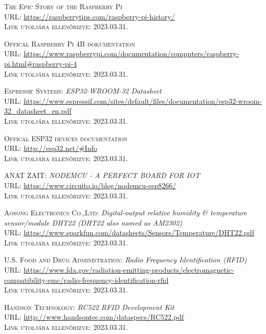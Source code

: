 \documentclass[
]{thesis-ekf}
\theoremstyle{definition}
\theoremstyle{remark}
\begin{document}
\begin{thebibliography}{20}
		\textsc{The Epic Story of the Raspberry Pi}\\
		\textsc{URL:} \url{https://raspberrytips.com/raspberry-pi-history/}\\
		\textsc{Link utoljára ellenőrizve:} 2023.03.31.
		
		\textsc{Offical Raspberry Pi 4B dokumentation}\\
		\textsc{URL:} \url{https://www.raspberrypi.com/documentation/computers/raspberry-pi.html#raspberry-pi-4}\\
		\textsc{Link utoljára ellenőrizve:} 2023.03.31.
		
		\textsc{Espressif Systems:} \emph{ESP32­-WROOM-­32 Datasheet}\\
		\textsc{URL:} \url{https://www.espressif.com/sites/default/files/documentation/esp32-wroom-32_datasheet_en.pdf}\\
		\textsc{Link utoljára ellenőrizve:} 2023.03.31.
		
		\textsc{Offical ESP32 devices documentation}\\
		\textsc{URL:} \url{http://esp32.net/#Info}\\
		\textsc{Link utoljára ellenőrizve:} 2023.03.31.
		
		\textsc{ANAT ZAIT:} \emph{NODEMCU - A PERFECT BOARD FOR IOT}\\
		\textsc{URL:} \url{https://www.circuito.io/blog/nodemcu-esp8266/}\\
		\textsc{Link utoljára ellenőrizve:} 2023.03.31.
		
		\textsc{Aosong Electronics Co.,Ltd:} \emph{Digital-output relative humidity \& temperature sensor/module DHT22 (DHT22 also named as AM2302)}\\
		\textsc{URL:} \url{https://www.sparkfun.com/datasheets/Sensors/Temperature/DHT22.pdf}\\
		\textsc{Link utoljára ellenőrizve:} 2023.03.31.
		
		\textsc{U.S. Food and Drug Administration:} \emph{Radio Frequency Identification (RFID)}\\
		\textsc{URL:} \url{https://www.fda.gov/radiation-emitting-products/electromagnetic-compatibility-emc/radio-frequency-identification-rfid}\\
		\textsc{Link utoljára ellenőrizve:} 2023.03.31.
		
		\textsc{Handson Technology:} \emph{RC522 RFID Development Kit}\\
		\textsc{URL:} \url{http://www.handsontec.com/dataspecs/RC522.pdf}\\
		\textsc{Link utoljára ellenőrizve:} 2023.03.31.
		

\end{thebibliography}
\end{document}

